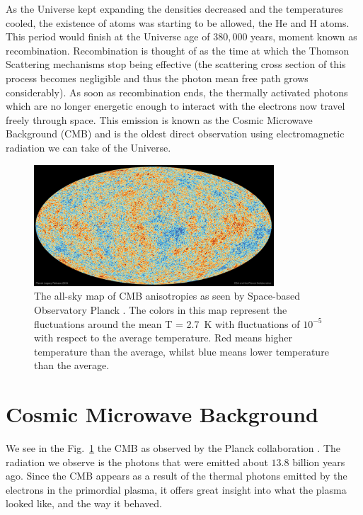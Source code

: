 As the Universe kept expanding the densities decreased and the temperatures cooled, the existence of atoms was starting to be allowed, the He and H atoms. This period would finish at the Universe age of $380,000$ years, moment known as recombination. Recombination is thought of as the time at which the Thomson Scattering mechanisms stop being effective (the scattering cross section of this process becomes negligible and thus the photon mean free path grows considerably).
As soon as recombination ends, the thermally activated photons which are no longer energetic enough to interact with the electrons now travel freely through space. This emission is known as the Cosmic Microwave Background (CMB) and is the oldest direct observation using electromagnetic radiation we can take of the Universe. \\


\begin{figure}[t]
	\centering
	\includegraphics[width=0.8\textwidth]{../figs/cmb.jpeg}
	\caption[The all-sky map of CMB anisotropies as seen by the Planck Satellite.]{The all-sky map of CMB anisotropies as seen by Space-based Observatory Planck \cite{Planck2018}. The colors in this map represent the fluctuations around the mean T = \SI{2.7}{K} with fluctuations of $10^{-5}$ with respect to the average temperature. Red means higher temperature than the average, whilst blue means lower temperature than the average.}
	\label{fig:cmb}
\end{figure}
\section{Cosmic Microwave Background}

We see in the Fig.~\ref{fig:cmb} the CMB as observed by the Planck collaboration \cite{Planck2018}. The radiation we observe is the photons that were emitted about $13.8$ billion years ago. Since the CMB appears as a result of the thermal photons emitted by the electrons in the primordial plasma, it offers great insight into what the plasma looked like, and the way it behaved.  \\

